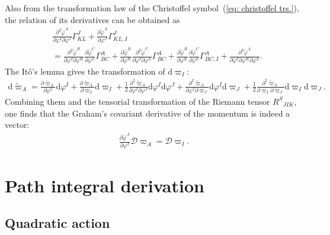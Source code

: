 \documentclass[aps, prd
, preprint
, nofootinbib 
, notitlepage
, longbibliography
]{revtex4-1}
\newcommand{\pdif}[2]{\frac{\partial #1}{\partial #2}}
\newcommand{\ppdpdpd}[3]{\frac{\partial^2 #1}{\partial #2\partial #3}}
\newcommand{\pppdpdpdpd}[4]{\frac{\partial^3 #1}{\partial #2\partial #3\partial #4}}
\newcommand{\dd}{\mathrm{d}}
\newcommand{\calD}{\mathcal{D}}
\newcommand{\bae}[1]{\begin{align} #1 \end{align}}
\begin{document}
Also from the transformation law of the Christoffel symbol~(\ref{eq: christoffel trs.}), the relation of its derivatives can be obtained as
\bae{
	&\ppdpdpd{\tilde{\varphi}^A}{\varphi^I}{\varphi^J}\Gamma^J_{KL}+\pdif{\tilde{\varphi}^A}{\varphi^J}\Gamma^J_{KL,I} \nonumber \\
	&=\ppdpdpd{\tilde{\varphi}^B}{\varphi^I}{\varphi^K}\pdif{\tilde{\varphi}^C}{\varphi^L}\Gamma^A_{BC}
	+\pdif{\tilde{\varphi}^B}{\varphi^K}\ppdpdpd{\tilde{\varphi}^C}{\varphi^I}{\varphi^L}\Gamma^A_{BC}
	+\pdif{\tilde{\varphi}^B}{\varphi^K}\pdif{\tilde{\varphi}^C}{\varphi^L}\Gamma^A_{BC,I}+\pppdpdpdpd{\tilde{\varphi}^A}{\varphi^I}{\varphi^K}{\varphi^L}.
}
The It\^o's lemma gives the transformation of $\dd\varpi_I$:
\bae{
	\dd\tilde{\varpi}_A=\pdif{\tilde{\varpi}_A}{\varphi^I}\dd\varphi^I+\pdif{\tilde{\varpi}_A}{\varpi_I}\dd\varpi_I
	+\frac{1}{2}\ppdpdpd{\tilde{\varpi}_A}{\varphi^I}{\varphi^J}\dd\varphi^I\dd\varphi^J+\ppdpdpd{\tilde{\varpi}_A}{\varphi^I}{\varpi_J}\dd\varphi^I\dd\varpi_J
	+\frac{1}{2}\ppdpdpd{\tilde{\varpi}_A}{\varpi_I}{\varpi_J}\dd\varpi_I\dd\varpi_J.
}
Combining them and the tensorial transformation of the Riemann tensor $R^S{}_{JIK}$, one finds that the Graham's covariant derivative of the momentum is indeed a vector:
\bae{
	\pdif{\tilde{\varphi}^A}{\varphi^I}\calD\varpi_A=\calD\varpi_I.
}



\section{Path integral derivation}

\subsection{Quadratic action}
\end{document}
